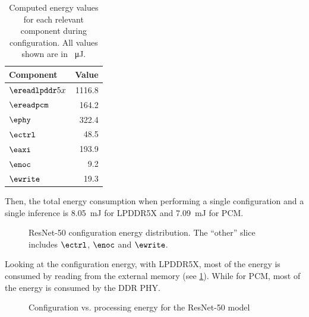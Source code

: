 \begin{table}[hbtp]
    \centering
    \begin{tabular}{@{}lr@{}}
    \toprule
    \textbf{Component} & \textbf{Value} \\
    \midrule
    $\ereadlpddr5x$ & 1116.8 \\
    $\ereadpcm$ & 164.2 \\
    $\ephy$ & 322.4 \\
    $\ectrl$ & 48.5 \\
    $\eaxi$ & 193.9 \\
    $\enoc$ & 9.2 \\
    $\ewrite$ & 19.3 \\
    \bottomrule
    \end{tabular}
    \caption{
        Computed energy values for each relevant component during configuration.
        All values shown are in \SI{}{\micro\joule}.
    }
    \label{tab:resnet50_energy}
\end{table}

Then, the total energy consumption when performing a single configuration and a single inference is \SI{8.05}{mJ} for LPDDR5X and \SI{7.09}{mJ} for PCM.

\begin{figure}[hbtp]
    \centering
    \hfill
    \caption{ResNet-50 configuration energy distribution. The ``other'' slice includes $\ectrl$, $\enoc$ and $\ewrite$.}
    \label{fig:resnet50_conf_energy_distribution}
\end{figure}

Looking at the configuration energy, with LPDDR5X, most of the energy is consumed by reading from the external memory (see \cref{fig:resnet50_conf_energy_distribution}).
While for PCM, most of the energy is consumed by the DDR PHY.

\begin{figure}[hbtp]
    \centering
    \hfill
    \caption{Configuration vs. processing energy for the ResNet-50 model}
    \label{fig:resnet50_conf_proc}
\end{figure}

